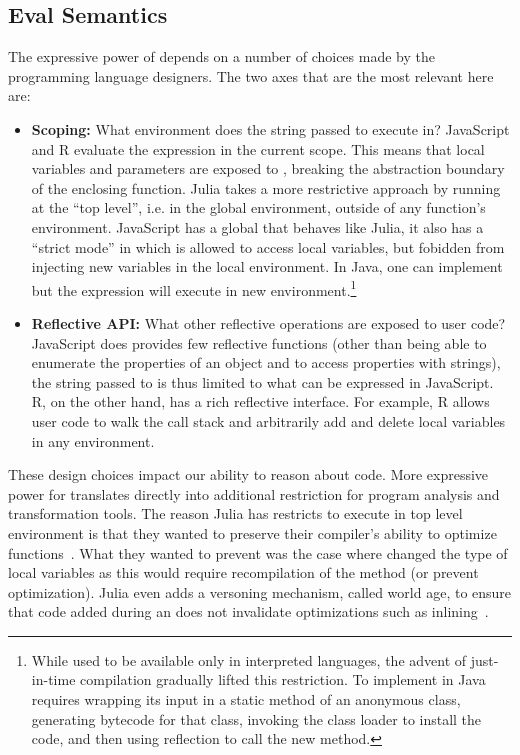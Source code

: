 \documentclass[USenglish,cleveref, autoref, thm-restate]{lipics-v2019}
\begin{document}
\subsection{Eval Semantics}

The expressive power of \eval depends on a number of choices made by
the programming language designers. The two axes that are the most
relevant here are:
\begin{itemize}
\item {\bf Scoping:} What environment does the string passed to \eval
  execute in? JavaScript and R evaluate the expression in the current
  scope. This means that local variables and parameters are exposed to
  \eval, breaking the abstraction boundary of the enclosing function.
  Julia takes a more restrictive approach by running \eval at the
  ``top level'', i.e. in the global environment, outside of any
  function's environment. JavaScript has a global \eval that behaves
  like Julia, it also has a ``strict mode'' in which \eval is allowed
  to access local variables, but fobidden from injecting new variables
  in the local environment. In Java, one can implement \eval but the
  expression will execute in new environment.\footnote{While \eval
  used to be available only in interpreted languages, the advent of
  just-in-time compilation gradually lifted this restriction. To
  implement \eval in Java requires wrapping its input in a static
  method of an anonymous class, generating bytecode for that class,
  invoking the class loader to install the code, and then using
  reflection to call the new method. }
\item {\bf Reflective API:} What other reflective operations are
  exposed to user code? JavaScript does provides few reflective
  functions (other than being able to enumerate the properties of an
  object and to access properties with strings), the string passed to
  \eval is thus limited to what can be expressed in JavaScript. R, on
  the other hand, has a rich reflective interface. For example, R
  allows user code to walk the call stack and arbitrarily add and
  delete local variables in any environment.
\end{itemize}

\noindent
These design choices impact our ability to reason about code. More
expressive power for \eval translates directly into additional
restriction for program analysis and transformation tools. The reason
Julia has restricts \eval to execute in top level environment is that
they wanted to preserve their compiler's ability to optimize
functions~\cite{oopsla18a}. What they wanted to prevent was the case
where \eval changed the type of local variables as this would require
recompilation of the method (or prevent optimization). Julia even adds
a versoning mechanism, called world age, to ensure that code added
during an \eval does not invalidate optimizations such as
inlining~\cite{oopsla20a}.
\end{document}
